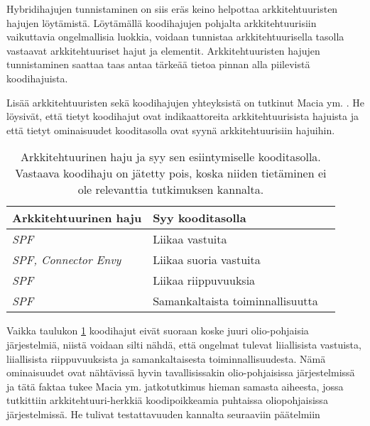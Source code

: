 \documentclass[finnish]{tktltiki2}
\numberwithin{table}{section}
\theoremstyle{definition}
\theoremstyle{remark}
\begin{document}
\noindent
Hybridihajujen tunnistaminen on siis eräs keino helpottaa arkkitehtuuristen hajujen löytämistä. Löytämällä koodihajujen pohjalta arkkitehtuurisiin vaikuttavia ongelmallisia luokkia, voidaan tunnistaa arkkitehtuurisella tasolla vastaavat arkkitehtuuriset hajut ja elementit. Arkkitehtuuristen hajujen tunnistaminen saattaa taas antaa tärkeää tietoa pinnan alla piilevistä koodihajuista.

Lisää arkkitehtuuristen sekä koodihajujen yhteyksistä on tutkinut Macia ym. \citep{macia_impact_2011}. He löysivät, että tietyt koodihajut ovat indikaattoreita arkkitehtuurisista hajuista ja että tietyt ominaisuudet kooditasolla ovat syynä arkkitehtuurisiin hajuihin. 



\begin{table}[ht]
	\centering
	\begin{tabular}{| l | l | m{3.2cm} |}
	\hline 
	\textbf{Arkkitehtuurinen haju} & \textbf{Syy kooditasolla} \\ \hline
	\textit{SPF} & Liikaa vastuita \\ \hline
	\textit{SPF, Connector Envy} & Liikaa suoria vastuita \\ \hline
	\textit{SPF} & Liikaa riippuvuuksia \\ \hline
	\textit{SPF} & Samankaltaista toiminnallisuutta \\ 
	\hline
	\end{tabular}
	\caption{Arkkitehtuurinen haju ja syy sen esiintymiselle kooditasolla. Vastaava koodihaju on jätetty pois, koska niiden tietäminen ei ole relevanttia tutkimuksen kannalta.}
	\label{tab:aspectSmells} 
\end{table}



\noindent
Vaikka taulukon \ref{tab:aspectSmells} koodihajut eivät suoraan koske juuri olio-pohjaisia järjestelmiä, niistä voidaan silti nähdä, että ongelmat tulevat liiallisista vastuista, liiallisista riippuvuuksista ja samankaltaisesta toiminnallisuudesta. Nämä ominaisuudet ovat nähtävissä hyvin tavallisissakin olio-pohjaisissa järjestelmissä ja tätä faktaa tukee Macia ym. jatkotutkimus hieman samasta aiheesta, jossa tutkittiin arkkitehtuuri-herkkiä koodipoikkeamia puhtaissa oliopohjaisissa järjestelmissä. He tulivat testattavuuden kannalta seuraaviin päätelmiin \citep{macia_enhancing_2013}

\end{document}
